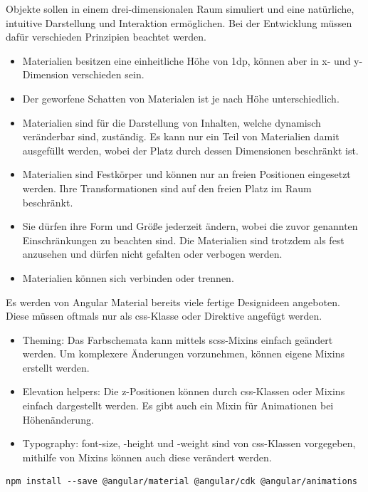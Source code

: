 Objekte sollen in einem drei-dimensionalen Raum simuliert und eine natürliche, intuitive Darstellung und Interaktion ermöglichen. Bei der Entwicklung müssen dafür verschieden Prinzipien beachtet werden. 
\begin{itemize}
  \item Materialien besitzen eine einheitliche Höhe von 1dp, können aber in x- und y-Dimension verschieden sein.
  \item Der geworfene Schatten von Materialen ist je nach Höhe unterschiedlich.
  \item Materialien sind für die Darstellung von Inhalten, welche dynamisch veränderbar sind, zuständig. Es kann nur ein Teil von Materialien damit ausgefüllt werden, wobei der Platz durch dessen Dimensionen beschränkt ist.
  \item Materialien sind Festkörper und können nur an freien Positionen eingesetzt werden. Ihre Transformationen sind auf den freien Platz im Raum beschränkt.
  \item Sie dürfen ihre Form und Größe jederzeit ändern, wobei die zuvor genannten Einschränkungen zu beachten sind. Die Materialien sind trotzdem als fest anzusehen und dürfen nicht gefalten oder verbogen werden.
  \item Materialien können sich verbinden oder trennen.
\end{itemize}

Es werden von Angular Material bereits viele fertige Designideen angeboten. Diese müssen oftmals nur als css-Klasse oder Direktive angefügt werden.

\begin{itemize}
  \item Theming: Das Farbschemata kann mittels scss-Mixins einfach geändert werden. Um komplexere Änderungen vorzunehmen, können eigene Mixins erstellt werden.
  \item Elevation helpers: Die z-Positionen können durch css-Klassen oder Mixins einfach dargestellt werden. Es gibt auch ein Mixin für Animationen bei Höhenänderung.
  \item Typography: font-size, -height und -weight sind von css-Klassen vorgegeben, mithilfe von Mixins können auch diese verändert werden.
\end{itemize}

\begin{lstlisting}[caption=Hinzufügen von Angular Materials]
  npm install --save @angular/material @angular/cdk @angular/animations
\end{lstlisting}

